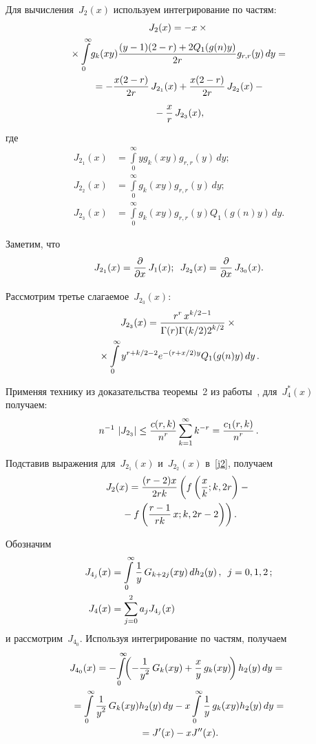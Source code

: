 \begin{multicols}{2}
Для вычисления~$J_2(x)$ используем интегрирование по частям:
\begin{multline}
\label{j2}
J_2(x) =- x\times{}\\
{}\times 
\int\limits^{\infty}_{0}\! g_k(xy)  \fr{(y - 1)(2 - r) + 2 
Q_1(g(n)y)}{2 r}g_{r,r}(y)\, dy = {}\\
{}= - \fr{x(2-r)}{2r}\, J_{2_1}(x) +  \fr{x(2-r)}{2r}\, J_{2_2}(x) -{}\\
{}- \fr{x}{r}\,J_{2_3}(x),
 \end{multline}
 где
 \begin{align*}
 J_{2_1}(x) &= \int\limits^{\infty}_{0}y g_k(xy)g_{r,r}(y)\, dy; \\ 
J_{2_2}(x) &= \int\limits^{\infty}_{0} g_k(xy)g_{r,r}(y) \,dy; \\
J_{2_3}(x) &= \int\limits^{\infty}_{0} g_k(xy)g_{r,r}(y)Q_1(g(n)y) \,dy.
 \end{align*}


Заметим, что 
$$
J_{2_1}(x) = \displaystyle\frac{\displaystyle \partial\mathstrut}{\displaystyle \partial x\mathstrut}\, J_1(x);\enskip 
J_{2_2}(x) = \displaystyle\frac{\displaystyle \partial\mathstrut}{\displaystyle \partial x\mathstrut}\, J_{3_0}(x).
$$

Рассмотрим третье сла\-га\-емое~$J_{2_3}(x)$:
\begin{multline*}
J_{2_3}(x) = \displaystyle\frac{\displaystyle r^r\,x^{k/2-1}\mathstrut}{\displaystyle \Gamma(r)\Gamma(k/2)2^{k/2}\mathstrut}\times{}\\
{}\times
\int\limits^{\infty}_{0} y^{r+k/2-2}
e^{-(r+x/2)y}Q_1(g(n)y)\,dy\,.
\end{multline*}

Применяя технику из доказательства теоремы~2 из работы~\cite{CMU}, для~$J^*_4(x)$ 
получаем:
$$
n^{-1}\, \left\vert J_{2_3}\right\vert \leq \displaystyle\frac{\displaystyle c(r,k)\mathstrut}{\displaystyle n^{r}\mathstrut} \sum\limits^{\infty}_{k=1} k^{-r}=
\displaystyle\frac{\displaystyle c_1(r,k)\mathstrut}{\displaystyle n^r\mathstrut}\,.
$$

Подставив выражения для~$J_{2_1}(x)$ и~$J_{2_2}(x)$ в~\eqref{j2}, получаем
\begin{multline}
\label{int2}
J_2(x) = \fr{(r-2)x}{2rk} \left(f\left(\fr{x}{k};k,2r\right) -{}\right.\\
\left.{}- f\left( 
\fr{r-1}{rk}\,x;k,2r-2\right)\right).
 \end{multline}


Обозначим
\begin{align*}
 J_{4_j}(x) &= \int\limits^{\infty}_{0} \displaystyle\frac{\displaystyle 1\mathstrut}{\displaystyle y\mathstrut}\,G_{k+2j}(xy)\,dh_2(y)\,, \enskip j = 0,1,2\,; 
\\
J_4(x)&= \sum\limits_{j=0}^{2} a_j  J_{4_j}(x)
\end{align*}
и рассмотрим~$J_{4_0}$. Используя интегрирование по частям, получаем
\begin{multline}
\label{j40}
 \hspace*{-3pt}J_{4_0}(x) = -\!\int\limits^{\infty}_{0} \!\!\left( -\fr{1}{y^2}\,G_{k}(xy) + 
\fr{x}{y}\,g_{k}(xy)\!\right) h_2(y)\,dy ={}\\
{}= \int\limits^{\infty}_{0} \fr{1}{y^2}\,G_{k}(xy) h_2(y)\,dy - x \int\limits^{\infty}_{0} 
\fr{1}{y}\,g_{k}(xy) h_2(y)\,dy ={}\\
{}= J^{\prime}(x) - x J^{\prime\prime}(x).
\end{multline}


\end{multicols}
